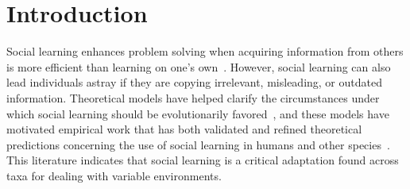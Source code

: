 \documentclass[letterpaper,11.5pt]{scrartcl}
\begin{document}
\begin{abstract}
\end{abstract}


\section{Introduction}

Social learning enhances problem solving when acquiring information from others is more efficient than learning on one's own~\citep{Laland2004}. However, social learning can also lead individuals astray if they are copying irrelevant, misleading, or outdated information. Theoretical models have helped clarify the circumstances under which social learning should be evolutionarily favored~\citep{BoydRicherson1985, aoki2014evolution,Kendal2018}, and these models have motivated empirical work that has both validated and refined theoretical predictions concerning the use of social learning in humans and other species~\citep{galef2005social,McElreath2005,Kendal2018,Allen2019}. This literature
indicates that social learning is a critical adaptation found across taxa for dealing
with variable environments. %
\end{document}
